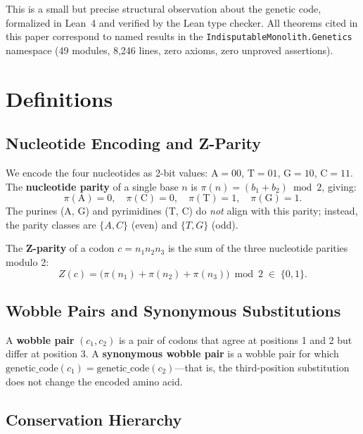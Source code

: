 \documentclass[11pt,twocolumn]{article}
\begin{document}
This is a small but precise structural observation about the genetic code,
formalized in Lean~4 and verified by the Lean type checker. All theorems
cited in this paper correspond to named results in the
\texttt{IndisputableMonolith.Genetics} namespace (49 modules, 8,246 lines,
zero axioms, zero unproved assertions).

\section{Definitions}

\subsection{Nucleotide Encoding and Z-Parity}

We encode the four nucleotides as 2-bit values:
$\text{A} = 00$, $\text{T} = 01$, $\text{G} = 10$, $\text{C} = 11$.
The \textbf{nucleotide parity} of a single base $n$ is
$\pi(n) = (b_1 + b_2) \bmod 2$, giving:
\[
  \pi(\text{A}) = 0, \quad \pi(\text{C}) = 0, \quad
  \pi(\text{T}) = 1, \quad \pi(\text{G}) = 1.
\]
The purines (A, G) and pyrimidines (T, C) do \emph{not} align with this
parity; instead, the parity classes are $\{A, C\}$ (even) and $\{T, G\}$
(odd).

The \textbf{Z-parity} of a codon $c = n_1 n_2 n_3$ is the sum of the
three nucleotide parities modulo 2:
\begin{equation}\label{eq:zparity}
  Z(c) = \bigl(\pi(n_1) + \pi(n_2) + \pi(n_3)\bigr) \bmod 2 \;\in\; \{0, 1\}.
\end{equation}

\subsection{Wobble Pairs and Synonymous Substitutions}

A \textbf{wobble pair} $(c_1, c_2)$ is a pair of codons that agree at
positions 1 and 2 but differ at position 3. A \textbf{synonymous wobble
pair} is a wobble pair for which $\text{genetic\_code}(c_1) =
\text{genetic\_code}(c_2)$---that is, the third-position substitution does
not change the encoded amino acid.

\subsection{Conservation Hierarchy}
\end{document}
